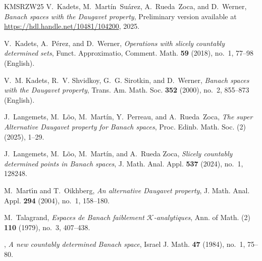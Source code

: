 \documentclass[11pt,a4paper,reqno]{amsart}
\numberwithin{equation}{section}
\newcommand{\1}{\mathbbm{1}}
\theoremstyle{plain}
\theoremstyle{definition}
\begin{document}
\begin{thebibliography}{KMSRZW25}
V.~Kadets, M.~Martín~Suárez, A.~Rueda~Zoca, and D.~Werner, \emph{Banach spaces with the {D}augavet property}, Preliminary version available at \href{https://hdl.handle.net/10481/104200}{https://hdl.handle.net/10481/104200}, 2025.

V.~Kadets, A.~P{\'e}rez, and D.~Werner, \emph{Operations with slicely countably determined sets}, Funct. Approximatio, Comment. Math. \textbf{59} (2018), no.~1, 77--98 (English).

V.~M. Kadets, R.~V. Shvidkoy, G.~G. Sirotkin, and D.~Werner, \emph{Banach spaces with the {Daugavet} property}, Trans. Am. Math. Soc. \textbf{352} (2000), no.~2, 855--873 (English).

J.~Langemets, M.~Lõo, M.~Martín, Y.~Perreau, and A.~Rueda~Zoca, \emph{The super {Alternative} {Daugavet} property for {Banach} spaces}, Proc. Edinb. Math. Soc. (2) (2025), 1–29.

J.~Langemets, M.~Lõo, M.~Martín, and A.~{Rueda Zoca}, \emph{Slicely countably determined points in {Banach} spaces}, J. Math. Anal. Appl. \textbf{537} (2024), no.~1, 128248.

M.~Mart\'{\i}n and T.~Oikhberg, \emph{An alternative {D}augavet property}, J. Math. Anal. Appl. \textbf{294} (2004), no.~1, 158--180. 

M.~Talagrand, \emph{Espaces de {B}anach faiblement {$\mathcal{K}$}-analytiques}, Ann. of Math. (2) \textbf{110} (1979), no.~3, 407--438. 

\bysame, \emph{A new countably determined {B}anach space}, Israel J. Math. \textbf{47} (1984), no.~1, 75--80. 

\end{thebibliography}
\end{document}
